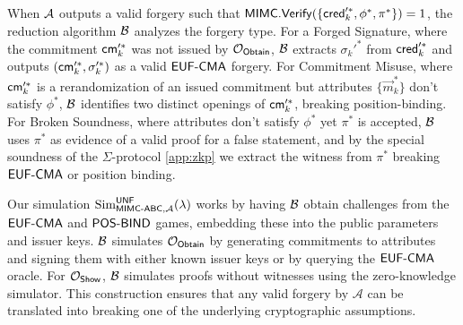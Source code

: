 When $\mathcal{A}$ outputs a valid forgery such that $\mathsf{MIMC.Verify}(\{\mathsf{cred}_k'^*, \phi^*, \pi^*\})=1$, the reduction algorithm $\mathcal{B}$ analyzes the forgery type. For a Forged Signature, where the commitment $\mathsf{cm}_k'^*$ was not issued by $\mathcal{O}_{\mathsf{Obtain}}$, $\mathcal{B}$ extracts $\sigma_k'^*$ from $\mathsf{cred}_k'^*$ and outputs $(\mathsf{cm}_k'^*, \sigma_k'^*)$ as a valid $\mathsf{EUF\text{-}CMA}$ forgery. For Commitment Misuse, where $\mathsf{cm}_k'^*$ is a rerandomization of an issued commitment but attributes $\{\vec{m}_k^*\}$ don't satisfy $\phi^*$, $\mathcal{B}$ identifies two distinct openings of $\mathsf{cm}_k'^*$, breaking position-binding. For Broken Soundness, where attributes don't satisfy $\phi^*$ yet $\pi^*$ is accepted, $\mathcal{B}$ uses $\pi^*$ as evidence of a valid proof for a false statement, and by the special soundness of the $\Sigma$-protocol \ref{app:zkp} we extract the witness from $\pi^*$ breaking $\mathsf{EUF\text{-}CMA}$ or position binding.


Our simulation $\mathrm{Sim}^{\mathsf{UNF}}_{\mathsf{MIMC\text{-}ABC}, \mathcal{A}}(\lambda)$ works by having $\mathcal{B}$ obtain challenges from the $\mathsf{EUF\text{-}CMA}$ and $\mathsf{POS\text{-}BIND}$ games, embedding these into the public parameters and issuer keys. $\mathcal{B}$ simulates $\mathcal{O}_{\mathsf{Obtain}}$ by generating commitments to attributes and signing them with either known issuer keys or by querying the $\mathsf{EUF\text{-}CMA}$ oracle. For $\mathcal{O}_{\mathsf{Show}}$, $\mathcal{B}$ simulates proofs without witnesses using the zero-knowledge simulator. This construction ensures that any valid forgery by $\mathcal{A}$ can be translated into breaking one of the underlying cryptographic assumptions.


